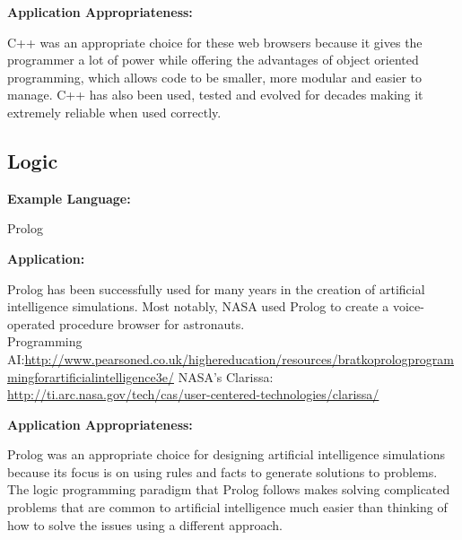 \documentclass[12pt]{article}
\begin{document}
\begin{addmargin}[1cm]{0em}
\textbf{Application Appropriateness:}
	\begin{addmargin}[1cm]{0em}
		C++ was an appropriate choice for these web browsers because it gives the programmer a lot of power while offering the advantages of object oriented programming, which allows code to be smaller, more modular and easier to manage. C++ has also been used, tested and evolved for decades making it extremely reliable when used correctly. 
	\end{addmargin}
\end{addmargin}

\subsection{Logic}
\begin{addmargin}[1cm]{0em}
\textbf{Example Language:}
	\begin{addmargin}[1cm]{0em}
		Prolog
	\end{addmargin}
\end{addmargin}

\begin{addmargin}[1cm]{0em}
\textbf{Application:}
	\begin{addmargin}[1cm]{0em}
	 Prolog has been successfully used for many years in the creation of artificial intelligence simulations. Most notably, NASA used Prolog to create a voice-operated procedure browser for astronauts.\\
	 Programming AI:\url{http://www.pearsoned.co.uk/highereducation/resources/bratkoprologprogrammingforartificialintelligence3e/}
	 NASA's Clarissa: \url{http://ti.arc.nasa.gov/tech/cas/user-centered-technologies/clarissa/}
	\end{addmargin}
\end{addmargin}

\begin{addmargin}[1cm]{0em}
\textbf{Application Appropriateness:}
	\begin{addmargin}[1cm]{0em}
		Prolog was an appropriate choice for designing artificial intelligence simulations because its focus is on using rules and facts to generate solutions to problems. The logic programming paradigm that Prolog follows makes solving complicated problems that are common to artificial intelligence much easier than thinking of how to solve the issues using a different approach.
	\end{addmargin}
\end{addmargin}
\end{document}
